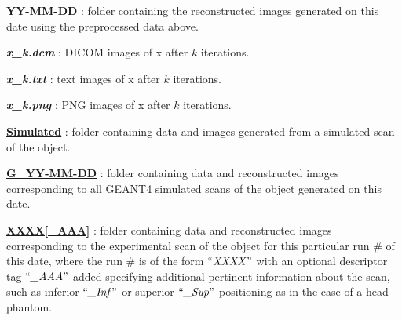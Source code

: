 \documentclass[landscape]{article}
\begin{document}
\begin{myEnumerate}[labelindent=0pt, leftmargin=*]
\begin{myEnumerate}[labelindent=1pt, leftmargin=*]
\begin{myEnumerate}[labelindent=1pt, leftmargin=*]
\begin{myEnumerate}[labelindent=1pt, leftmargin=*]
\begin{myEnumerate}[labelindent=1pt, leftmargin=*]
\begin{myEnumerate}[labelindent=1pt, leftmargin=*]
\begin{myEnumerate}[labelindent=1pt, leftmargin=*]
\begin{myEnumerate}[labelindent=1pt, leftmargin=*]
\begin{myEnumerate}[labelindent=1pt, leftmargin=*]
                                    \begin{myEnumerate}[labelindent=1pt, leftmargin=*]
                                        \item \ul{\textbf{YY-MM-DD}} : folder containing the reconstructed images generated on this date using the preprocessed data above.
                                            \begin{myEnumerate}[labelindent=1pt, leftmargin=*]
                                                \item \textbf{\textit{x\_k.dcm}} : DICOM images of x after $k$ iterations.
                                                \item \textbf{\textit{x\_k.txt}} : text images of x after $k$ iterations.
                                                \item \textbf{\textit{x\_k.png}} : PNG images of x after $k$ iterations.
                                            \end{myEnumerate}
                                    \end{myEnumerate}
                                \end{myEnumerate}
                            \end{myEnumerate}
                        \end{myEnumerate}
                    \end{myEnumerate}
                \end{myEnumerate}
            \end{myEnumerate}
        \end{myEnumerate}
        \item \ul{\textbf{Simulated}} : folder containing data and images generated from a simulated scan of the object.
        \begin{myEnumerate}[labelindent=1pt, leftmargin=*]
            \item \ul{\textbf{G\_YY-MM-DD}} : folder containing data and reconstructed images corresponding to all GEANT4 simulated scans of the object generated on this date.
            \begin{myEnumerate}[labelindent=1pt, leftmargin=*]
                \item \ul{\textbf{XXXX[\_AAA]}} : folder containing data and reconstructed images corresponding to the experimental scan of the object for this particular run \# of this date, where the run \# is of the form $\textrm{``\textit{XXXX}''}$ with an optional descriptor tag $\textrm{``\textit{\_AAA}''}$ added specifying additional pertinent information about the scan, such as inferior $\textrm{``\textit{\_Inf}''}$ or superior $\textrm{``\textit{\_Sup}''}$ positioning as in the case of a head phantom.

\end{myEnumerate}
\end{myEnumerate}
\end{myEnumerate}
\end{myEnumerate}
\end{document}
